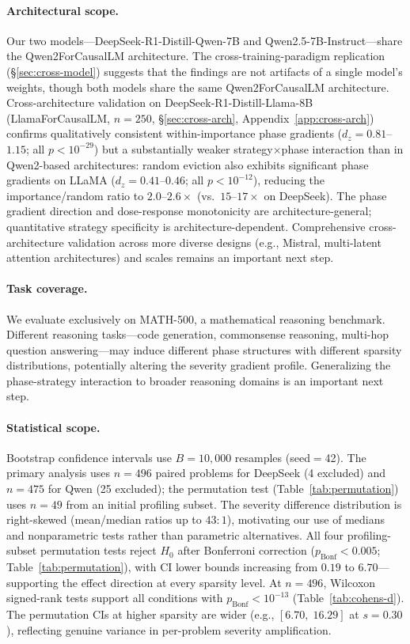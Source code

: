 \paragraph{Architectural scope.}
Our two models---DeepSeek-R1-Distill-Qwen-7B and Qwen2.5-7B-Instruct---share the Qwen2ForCausalLM architecture.
The cross-training-paradigm replication (\S\ref{sec:cross-model}) suggests that the findings are not artifacts of a single model's weights, though both models share the same Qwen2ForCausalLM architecture.
Cross-architecture validation on DeepSeek-R1-Distill-Llama-8B (LlamaForCausalLM, $n{=}250$, \S\ref{sec:cross-arch}, Appendix~\ref{app:cross-arch}) confirms qualitatively consistent within-importance phase gradients ($d_z{=}0.81$--$1.15$; all $p < 10^{-29}$) but a substantially weaker strategy${\times}$phase interaction than in Qwen2-based architectures: random eviction also exhibits significant phase gradients on LLaMA ($d_z{=}0.41$--$0.46$; all $p < 10^{-12}$), reducing the importance/random ratio to $2.0$--$2.6{\times}$ (vs.\ $15$--$17{\times}$ on DeepSeek). The phase gradient direction and dose-response monotonicity are architecture-general; quantitative strategy specificity is architecture-dependent. Comprehensive cross-architecture validation across more diverse designs (e.g., Mistral, multi-latent attention architectures) and scales remains an important next step.


\paragraph{Task coverage.}
We evaluate exclusively on MATH-500, a mathematical reasoning benchmark.
Different reasoning tasks---code generation, commonsense reasoning, multi-hop question answering---may induce different phase structures with different sparsity distributions, potentially altering the severity gradient profile.
Generalizing the phase-strategy interaction to broader reasoning domains is an important next step.


\paragraph{Statistical scope.}
Bootstrap confidence intervals use $B{=}10{,}000$ resamples (seed$=$42). The primary analysis uses $n{=}496$ paired problems for DeepSeek (4 excluded) and $n{=}475$ for Qwen (25 excluded); the permutation test (Table~\ref{tab:permutation}) uses $n{=}49$ from an initial profiling subset.
The severity difference distribution is right-skewed (mean/median ratios up to $43{:}1$), motivating our use of medians and nonparametric tests rather than parametric alternatives.
All four profiling-subset permutation tests reject $H_0$ after Bonferroni correction ($p_{\text{Bonf}} < 0.005$; Table~\ref{tab:permutation}), with CI lower bounds increasing from $0.19$ to $6.70$---supporting the effect direction at every sparsity level. At $n{=}496$, Wilcoxon signed-rank tests support all conditions with $p_{\text{Bonf}} < 10^{-13}$ (Table~\ref{tab:cohens-d}). The permutation CIs at higher sparsity are wider (e.g., $[6.70,\; 16.29]$ at $s{=}0.30$), reflecting genuine variance in per-problem severity amplification.

